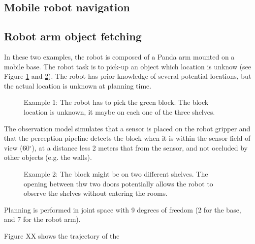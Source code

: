 \documentclass[letterpaper, 10 pt, conference]{ieeeconf}  %
\begin{document}
\subsection{Mobile robot navigation} \label{experiement:navigation}

\subsection{Robot arm object fetching} \label{experiement:mobile_manipulation}
In these two examples, the robot is composed of a Panda arm mounted on a mobile base. The robot task is to pick-up an object which location is unknow (see Figure \ref{fig:arm_example_1} and \ref{fig:arm_example_2}). The robot has prior knowledge of several potential locations, but the actual location is unknown at planning time. 


\begin{figure}[!htb]
 \caption{Example 1: The robot has to pick the green block. The block location is unknown, it maybe on each one of the three shelves.}
 \label{fig:arm_example_1}
\end{figure}

The observation model simulates that a sensor is placed on the robot gripper and that the perception pipeline detects the block when it is within the sensor field of view (60$^{\circ}$), at a distance less 2 meters that from the sensor, and not occluded by other objects (e.g. the walls).

\begin{figure}[!htb]
 \caption{Example 2: The block might be on two different shelves. The opening between thw two doors potentially allows the robot to observe the shelves without entering the rooms.}
 \label{fig:arm_example_2}
\end{figure}

Planning is performed in joint space with 9 degrees of freedom (2 for the base, and 7 for the robot arm).

Figure XX shows the trajectory of the 
\end{document}
